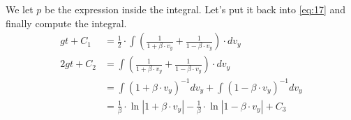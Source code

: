\documentclass[paper=a4, fontsize=11pt]{scrartcl} %
\numberwithin{equation}{section} %
\numberwithin{figure}{section} %
\numberwithin{table}{section} %
\begin{document}
We let $p$ be the expression inside the integral. Let's put it back into \ref{eq:17} and finally compute the integral.
\begin{align} 
g t + C_1  &= \frac{1}{2} \cdot \int \left(\frac{1}{1 + \beta \cdot v_y} + \frac{1}{1 - \beta \cdot v_y}\right) \cdot d v_y \label{eq:26} \\
2g t + C_2 &= \int \left(\frac{1}{1 + \beta \cdot v_y} + \frac{1}{1 - \beta \cdot v_y}\right) \cdot d v_y \\
           &= \int (1 + \beta \cdot v_y)^{-1} d v_y + \int (1 - \beta \cdot v_y)^{-1} d v_y \\
           &=  \frac{1}{\beta} \cdot \ln{|1 + \beta \cdot v_y|} - \frac{1}{\beta} \cdot \ln{|1 - \beta \cdot v_y|} + C_3
\end{align}
\end{document}
